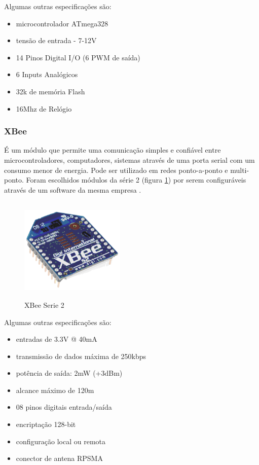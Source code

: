 Algumas outras especificações são:
\begin{itemize}
\item{microcontrolador ATmega328}
\item{tensão de entrada - 7-12V}
\item{14 Pinos Digital I/O (6 PWM de saída)}
\item{6 Inputs Analógicos}
\item{32k de memória Flash}
\item{16Mhz de Relógio}
\end{itemize}
%
\subsubsection{XBee}

É um módulo que permite uma comunicação simples e confiável entre microcontroladores, computadores, sistemas através de uma porta serial com um consumo menor de energia. Pode ser utilizado em redes ponto-a-ponto e multi-ponto. Foram escolhidos módulos da série 2 (figura \ref{fig:xbee}) por serem configuráveis através de um software da mesma empresa \cite{xctu_software}.

\begin{figure}[H]
\begin{center}
\includegraphics[width=5cm,height=5cm,keepaspectratio]{figuras/xbee_serie2.png}
\caption{\label{fig:xbee} XBee Serie 2}
\end{center}
\end{figure}

Algumas outras especificações são:
\begin{itemize}
\item{entradas de 3.3V @ 40mA}
\item{transmissão de dados máxima de 250kbps}
\item{potência de saída: 2mW (+3dBm)}
\item{alcance máximo de 120m}
\item{08 pinos digitais entrada/saída}
\item{encriptação 128-bit}
\item{configuração local ou remota}
\item{conector de antena RPSMA}
\end{itemize}
%
